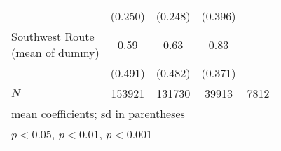 \begin{table}[htbp]
\begin{tabular}{l*{4}{c}}
            &     (0.250)         &     (0.248)         &     (0.396)         &                     \\
[1em]
\Centerstack{Southwest Route \\ (mean of dummy)}&        0.59         &        0.63         &        0.83         &                     \\
            &     (0.491)         &     (0.482)         &     (0.371)         &                     \\
\hline
\(N\)       &      153921         &      131730         &       39913         &        7812         \\
\hline\hline
\multicolumn{5}{l}{\footnotesize mean coefficients; sd in parentheses}\\
\multicolumn{5}{l}{\footnotesize \sym{*} \(p<0.05\), \sym{**} \(p<0.01\), \sym{***} \(p<0.001\)}\\
\end{tabular}
\end{table}
